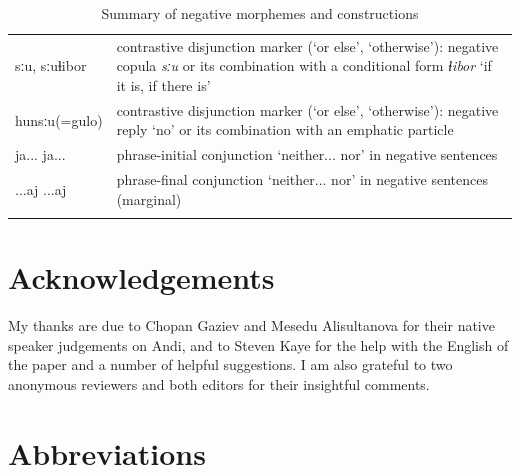 \documentclass[output=paper,colorlinks=true, citecolor=brown]{langscibook}
\begin{document}
\begin{table}
\begin{tabularx}{\textwidth}{p{22mm}@{}Q}
{sːu}, {sːuɬibor}  & contrastive disjunction marker (‘or else’, ‘otherwise’): negative copula \textit{sːu} or its combination with a conditional form \textit{ɬibor} ‘if it is, if there is’\\
{hunsːu}(={gulo}) & contrastive disjunction marker (‘or else’, ‘otherwise’): negative reply ‘no’ or its combination with an emphatic particle\\
{ja... ja...} & phrase-initial conjunction ‘neither... nor’ in negative sentences\\
{...aj ...aj} & phrase-final conjunction ‘neither... nor’ in negative sentences (marginal)\\
\lspbottomrule
\end{tabularx}
\caption{Summary of negative morphemes and constructions}
\label{tab:and:2}
\end{table}



\section*{Acknowledgements}

My thanks are due to Chopan Gaziev and Mesedu Alisultanova for their native speaker judgements on Andi, and to Steven Kaye for the help with the English of the paper and a number of helpful suggestions. I am also grateful to two anonymous reviewers and both editors for their insightful comments.


\section*{Abbreviations}
\end{document}
